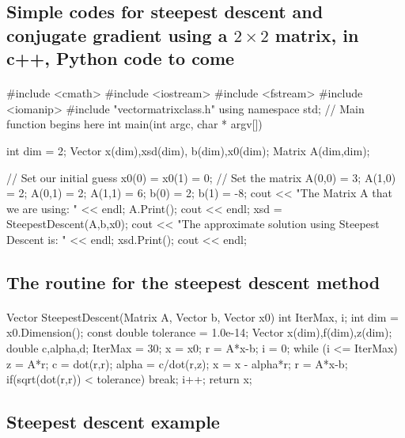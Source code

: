 \documentclass[%
oneside,                 %
final,                   %
10pt]{article}
\begin{document}
\subsection{Simple codes for  steepest descent and conjugate gradient using a $2\times 2$ matrix, in c++, Python code to come}

\paragraph{}
\bcppcod
#include <cmath>
#include <iostream>
#include <fstream>
#include <iomanip>
#include "vectormatrixclass.h"
using namespace  std;
//   Main function begins here
int main(int  argc, char * argv[]){
  int dim = 2;
  Vector x(dim),xsd(dim), b(dim),x0(dim);
  Matrix A(dim,dim);

  // Set our initial guess
  x0(0) = x0(1) = 0;
  // Set the matrix
  A(0,0) =  3;    A(1,0) =  2;   A(0,1) =  2;   A(1,1) =  6;
  b(0) = 2; b(1) = -8;
  cout << "The Matrix A that we are using: " << endl;
  A.Print();
  cout << endl;
  xsd = SteepestDescent(A,b,x0);
  cout << "The approximate solution using Steepest Descent is: " << endl;
  xsd.Print();
  cout << endl;
}
\ecppcod



\subsection{The routine for the steepest descent method}

\paragraph{}
\bcppcod
Vector SteepestDescent(Matrix A, Vector b, Vector x0){
  int IterMax, i;
  int dim = x0.Dimension();
  const double tolerance = 1.0e-14;
  Vector x(dim),f(dim),z(dim);
  double c,alpha,d;
  IterMax = 30;
  x = x0;
  r = A*x-b;
  i = 0;
  while (i <= IterMax){
    z = A*r;
    c = dot(r,r);
    alpha = c/dot(r,z);
    x = x - alpha*r;
    r =  A*x-b;
    if(sqrt(dot(r,r)) < tolerance) break;
    i++;
  }
  return x;
}
\ecppcod




\subsection{Steepest descent example}
\end{document}
